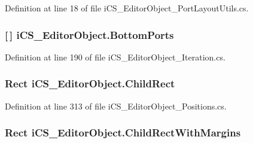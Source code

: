 Definition at line 18 of file i\+C\+S\+\_\+\+Editor\+Object\+\_\+\+Port\+Layout\+Utils.\+cs.

\hypertarget{classi_c_s___editor_object_a6a319287a786143fa6906b2b2382c10f}{
\subsubsection[{Bottom\+Ports}]{ \mbox{[}$\,$\mbox{]} i\+C\+S\+\_\+\+Editor\+Object.\+Bottom\+Ports\hspace{0.3cm}{\ttfamily [get]}}}\label{classi_c_s___editor_object_a6a319287a786143fa6906b2b2382c10f}


Definition at line 190 of file i\+C\+S\+\_\+\+Editor\+Object\+\_\+\+Iteration.\+cs.

\hypertarget{classi_c_s___editor_object_a539a253d19d4d34b54a32fc85392f06a}{
\subsubsection[{Child\+Rect}]{\setlength{\rightskip}{0pt plus 5cm}Rect i\+C\+S\+\_\+\+Editor\+Object.\+Child\+Rect\hspace{0.3cm}{\ttfamily [get]}}}\label{classi_c_s___editor_object_a539a253d19d4d34b54a32fc85392f06a}


Definition at line 313 of file i\+C\+S\+\_\+\+Editor\+Object\+\_\+\+Positions.\+cs.

\hypertarget{classi_c_s___editor_object_a275fba9e9e2cac8bd1d8d71acb16590d}{
\subsubsection[{Child\+Rect\+With\+Margins}]{\setlength{\rightskip}{0pt plus 5cm}Rect i\+C\+S\+\_\+\+Editor\+Object.\+Child\+Rect\+With\+Margins\hspace{0.3cm}{\ttfamily [get]}}}\label{classi_c_s___editor_object_a275fba9e9e2cac8bd1d8d71acb16590d}


